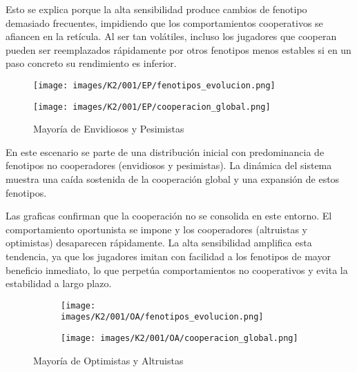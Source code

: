 \documentclass[a4paper,12pt]{report}
\begin{document}
Esto se explica porque la alta sensibilidad produce cambios de fenotipo demasiado frecuentes, impidiendo que los comportamientos cooperativos se afiancen en la retícula. Al ser tan volátiles, incluso los jugadores que cooperan pueden ser reemplazados rápidamente por otros fenotipos menos estables si en un paso concreto su rendimiento es inferior.


\begin{figure}[h]
    \centering
    \begin{minipage}{0.49\textwidth}
    \centering
    \texttt{[image: images/K2/001/EP/fenotipos\_evolucion.png]}
    \label{fig:enter-label}
    \end{minipage}
    \hfill
    \begin{minipage}{0.49\textwidth}
    \centering
    \texttt{[image: images/K2/001/EP/cooperacion\_global.png]}
    \label{fig:enter-label}
    \end{minipage}
    \caption{Mayoría de Envidiosos y Pesimistas}
\end{figure}

\newpage

En este escenario se parte de una distribución inicial con predominancia de fenotipos no cooperadores (envidiosos y pesimistas). La dinámica del sistema muestra una caída sostenida de la cooperación global y una expansión de estos fenotipos.

Las graficas confirman que la cooperación no se consolida en este entorno. El comportamiento oportunista se impone y los cooperadores (altruistas y optimistas) desaparecen rápidamente. La alta sensibilidad amplifica esta tendencia, ya que los jugadores imitan con facilidad a los fenotipos de mayor beneficio inmediato, lo que perpetúa comportamientos no cooperativos y evita la estabilidad a largo plazo.

\begin{figure}[h]
    \centering
    \begin{subfigure}[t]{0.49\textwidth}
        \centering
        \texttt{[image: images/K2/001/OA/fenotipos\_evolucion.png]}
        \label{fig:enter-label}
    \end{subfigure}
    \hfill
    \begin{subfigure}[t]{0.49\textwidth}
        \centering
        \texttt{[image: images/K2/001/OA/cooperacion\_global.png]}
        \label{fig:enter-label}
    \end{subfigure}
    \caption{Mayoría de Optimistas y Altruistas}
\end{figure}
\end{document}
